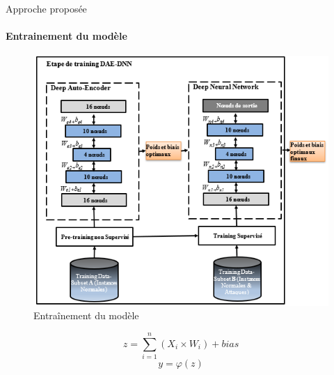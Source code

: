 \documentclass[aspectratio=169,professionalfonts, 12pt]{beamer}
\begin{document}
\begin{frame}{Approche proposée}
	\framesubtitle{Entrainement du modèle}
\begin{minipage}{0.5\textwidth}
	\begin{figure}[t]
	       \centering
 \includegraphics[height=0.7\textheight]{images/Training}
 			\caption{Entraînement du modèle}
	    \end{figure}
\end{minipage}
	\begin{minipage}{0.3\textwidth}
  	\begin{block}{}
	 $$z = \sum_{i=1}^n (X_i \times W_i) + bias$$
	$$y = \varphi (z)$$
	\end{block}
\end{minipage}
\end{frame} 
\end{document}
